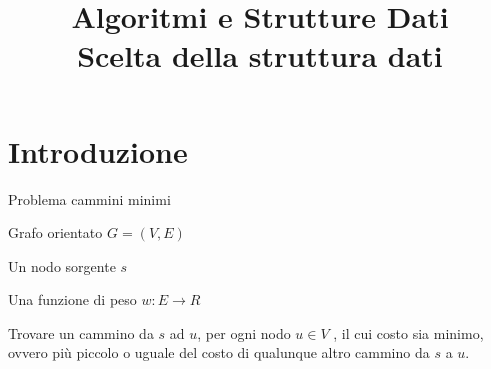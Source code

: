 
\title[ASD - Scelta struttura dati]{\textbf{Algoritmi e Strutture Dati}\\[24pt]Scelta della struttura dati}

\renewcommand{\Primo}{\mathit{start}\xspace}
\renewcommand{\Ultimo}{\mathit{end}\xspace}

\usepackage{tikz}
\usetikzlibrary{trees}
\usetikzlibrary{matrix}
\usetikzlibrary{graphs}
\usetikzlibrary{shapes}
\usetikzlibrary{positioning}
\usetikzlibrary{snakes}
\usepackage{xmpmulti}
\usepackage{listings}





\graphicspath{{figs/11/}}



\FrameTitle{}

\FrameContent



\section{Introduzione}

\begin{frame}{Problema cammini minimi}

\vspace{-9pt}
\begin{myboxtitle}[Input]
\BI
\item \alert{Grafo orientato} $G=(V,E)$
\item Un nodo \alert{sorgente} $s$
\item Una \alert{funzione di peso} $w: E \rightarrow R$
\EI
\end{myboxtitle}

\begin{myboxtitle}[Definizione]
\end{myboxtitle}

\begin{myboxtitle}[Output]
Trovare un cammino da $s$ ad $u$, per ogni nodo $u \in V$ , il cui costo sia minimo, ovvero più 
piccolo o uguale del costo di qualunque altro cammino da $s$ a $u$.
\end{myboxtitle}

\end{frame}

